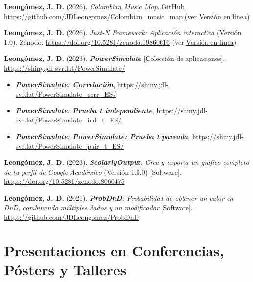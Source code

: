 \documentclass[11pt,a4paper,]{awesome-cv}
\providecommand{\tightlist}{%
	\setlength{\itemsep}{0pt}\setlength{\parskip}{0pt}}
\begin{document}
\begingroup
  \footnotesize
  \setlength{\parindent}{-0.5in}
  \setlength{\leftskip}{0.5in}

\textbf{Leongómez, J. D.} (2026). \emph{Colombian Music Map}. GitHub.
\url{https://github.com/JDLeongomez/Colombian_music_map} (ver
\href{https://jdleongomez.github.io/Colombian_music_map/}{Versión en
línea})

\textbf{Leongómez, J. D.} (2026). \emph{Just-N Framework: Aplicación
interactiva} (Versión 1.0). Zenodo.
\url{https://doi.org/10.5281/zenodo.19860616} (ver
\href{https://jdleongomez.github.io/just_n_app/}{Versión en línea})

\textbf{Leongómez, J. D.} (2023). \textbf{\emph{PowerSimulate}}
{[}Colección de aplicaciones{]}.
\url{https://shiny.jdl-svr.lat/PowerSimulate/}

\vspace{-2mm}

\begin{itemize}
\tightlist
\item
  \textbf{\emph{PowerSimulate: Correlación}},
  \url{https://shiny.jdl-svr.lat/PowerSimulate_corr_ES/}
\item
  \textbf{\emph{PowerSimulate: Prueba t independiente}},
  \url{https://shiny.jdl-svr.lat/PowerSimulate_ind_t_ES/}
\item
  \textbf{\emph{PowerSimulate: PowerSimulate: Prueba t pareada}},
  \url{https://shiny.jdl-svr.lat/PowerSimulate_pair_t_ES/}
\end{itemize}

\textbf{Leongómez, J. D.} (2023). \emph{\textbf{ScolarlyOutput}: Crea y
exporta un gráfico completo de tu perfil de Google Académico} (Versión
1.0.0) {[}Software{]}.
\href{https://github.com/JDLeongomez/ScholarlyOutput_ES}{https://doi.org/10.5281/zenodo.8060475}

\textbf{Leongómez, J. D.} (2021). \emph{\textbf{ProbDnD}: Probabilidad
de obtener un valor en DnD, combinando múltiples dados y un modificador}
{[}Software{]}. \url{https://github.com/JDLeongomez/ProbDnD}

\endgroup

\section{Presentaciones en Conferencias, Pósters y
Talleres}\label{presentaciones-en-conferencias-puxf3sters-y-talleres}

\begingroup
  \footnotesize
  \setlength{\parindent}{-0.5in}
  \setlength{\leftskip}{0.5in}
\end{document}
